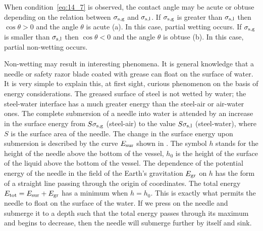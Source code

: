 When condition~\eqref{eq:14_7} is observed, the contact angle may be acute or obtuse depending on the relation between $\sigma_{\text{s,g}}$ and $\sigma_{\text{s,l}}$. If $\sigma_{\text{s,g}}$ is greater than $\sigma_{\text{s,l}}$ then $\cos\theta>0$ and the angle $\theta$ is acute (a). In this case, partial wetting occurs. If $\sigma_{\text{s,g}}$ is smaller than $\sigma_{\text{s,l}}$ then $\cos\theta<0$ and the angle $\theta$ is obtuse (b). In this case, partial non-wetting occurs.

Non-wetting may result in interesting phenomena. It is general knowledge that a needle or safety razor blade coated with grease can float on the surface of water. It is very simple to explain this, at first sight, curious phenomenon on the basis of energy considerations. The greased surface of steel is not wetted by water; the steel-water interface has a much greater energy than the steel-air or air-water ones. The complete submersion of a needle into water is attended by an increase in the surface energy from $S\sigma_{\text{s,g}}$ (steel-air) to the value $S\sigma_{\text{s,l}}$ (steel-water), where $S$ is the surface area of the needle. The change in the surface energy upon submersion is described by the curve $E_{\text{sur}}$ shown in . The symbol $h$ stands for the height of the needle above the bottom of the vessel, $h_0$ is the height of the surface of the liquid above the bottom of the vessel. The dependence of the potential energy of the needle in the field of the Earth's gravitation $E_{\text{gr}}$ on $h$ has the form of a straight line passing through the origin of coordinates. The total energy $E_{\text{tot}}=E_{\text{sur}}+E_{\text{gr}}$ has a minimum when $h=h_0$. This is exactly what permits the needle to float on the surface of the water. If we press on the needle and submerge it to a depth such that the total energy passes through its maximum and begins to decrease, then the needle will submerge further by itself and sink.

